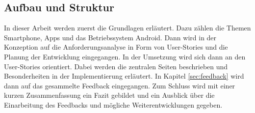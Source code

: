 \subsection{Aufbau und Struktur}
In dieser Arbeit werden zuerst die Grundlagen erläutert. Dazu zählen die Themen Smartphone, Apps und das Betriebssystem Android. Dann wird in  der Konzeption auf die Anforderungsanalyse in Form von User-Stories und die Planung der Entwicklung eingegangen. In der Umsetzung wird sich dann an den User-Stories orientiert. Dabei werden die zentralen Seiten beschrieben und Besonderheiten in der Implementierung erläutert. In Kapitel \ref{sec:feedback} wird dann auf das gesammelte Feedback eingegangen. Zum Schluss wird mit einer kurzen Zusammenfassung ein Fazit gebildet und ein Ausblick über die Einarbeitung des Feedbacks und mögliche Weiterentwicklungen gegeben.

\clearpage